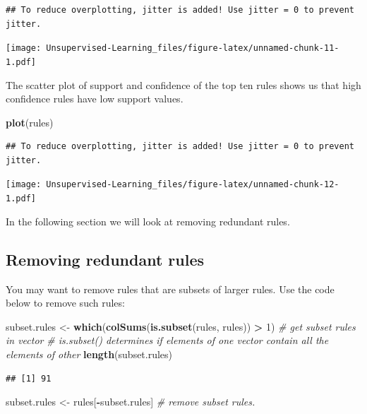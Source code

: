 \documentclass[
]{book}
\newenvironment{Shaded}{\begin{snugshade}}{\end{snugshade}}
\newcommand{\CommentTok}[1]{\textcolor[rgb]{0.56,0.35,0.01}{\textit{#1}}}
\newcommand{\DecValTok}[1]{\textcolor[rgb]{0.00,0.00,0.81}{#1}}
\newcommand{\KeywordTok}[1]{\textcolor[rgb]{0.13,0.29,0.53}{\textbf{#1}}}
\newcommand{\NormalTok}[1]{#1}
\newcommand{\OperatorTok}[1]{\textcolor[rgb]{0.81,0.36,0.00}{\textbf{#1}}}
\newcommand{\StringTok}[1]{\textcolor[rgb]{0.31,0.60,0.02}{#1}}
\begin{document}
\begin{verbatim}
## To reduce overplotting, jitter is added! Use jitter = 0 to prevent jitter.
\end{verbatim}

\texttt{[image: Unsupervised-Learning\_files/figure-latex/unnamed-chunk-11-1.pdf]}

The scatter plot of support and confidence of the top ten rules shows us that high confidence rules have low support values.

\begin{Shaded}
\begin{Highlighting}[]
\KeywordTok{plot}\NormalTok{(rules)}
\end{Highlighting}
\end{Shaded}

\begin{verbatim}
## To reduce overplotting, jitter is added! Use jitter = 0 to prevent jitter.
\end{verbatim}

\texttt{[image: Unsupervised-Learning\_files/figure-latex/unnamed-chunk-12-1.pdf]}

In the following section we will look at removing redundant rules.

\hypertarget{removing-redundant-rules}{%
\subsection{Removing redundant rules}\label{removing-redundant-rules}}

You may want to remove rules that are subsets of larger rules. Use the code below to remove such rules:

\begin{Shaded}
\begin{Highlighting}[]
\NormalTok{subset.rules <-}\StringTok{ }\KeywordTok{which}\NormalTok{(}\KeywordTok{colSums}\NormalTok{(}\KeywordTok{is.subset}\NormalTok{(rules, rules)) }\OperatorTok{>}\StringTok{ }\DecValTok{1}\NormalTok{) }\CommentTok{# get subset rules in vector}
\CommentTok{# is.subset() determines if elements of one vector contain all the elements of other}
\KeywordTok{length}\NormalTok{(subset.rules)}
\end{Highlighting}
\end{Shaded}

\begin{verbatim}
## [1] 91
\end{verbatim}

\begin{Shaded}
\begin{Highlighting}[]
\NormalTok{subset.rules <-}\StringTok{ }\NormalTok{rules[}\OperatorTok{-}\NormalTok{subset.rules] }\CommentTok{# remove subset rules.}
\end{Highlighting}
\end{Shaded}
\end{document}
